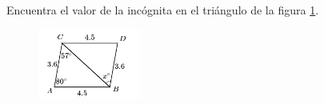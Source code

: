 \question[10]  Encuentra el valor de la incógnita en el triángulo de la figura \ref{fig:angle_triangle_07}.
\begin{figure}[H]
    \begin{center}
        \includegraphics[width=0.3\textwidth]{../images/angle_triangle_07.png}
    \end{center}
    \caption{}
    \label{fig:angle_triangle_07}
\end{figure}